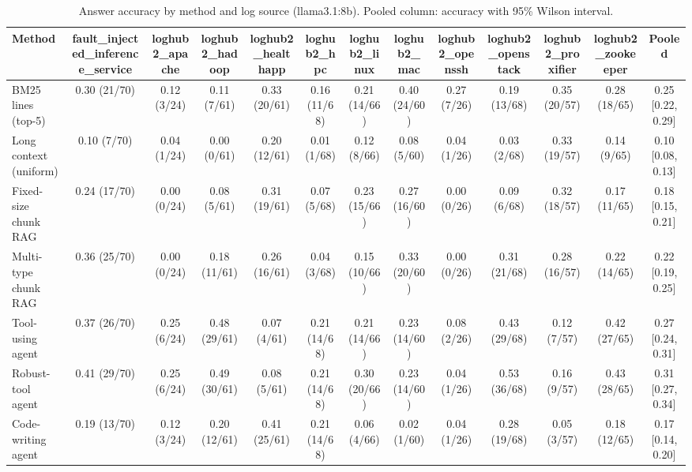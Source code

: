 \begin{table}[t]
\centering
\caption{Answer accuracy by method and log source (llama3.1:8b). Pooled column: accuracy with 95\% Wilson interval.}
\label{tab:main_comparison__llama3_1_8b}
\begin{tabular}{@{}lcccccccccccc@{}}
\toprule
Method & fault\_injected\_inference\_service & loghub2\_apache & loghub2\_hadoop & loghub2\_healthapp & loghub2\_hpc & loghub2\_linux & loghub2\_mac & loghub2\_openssh & loghub2\_openstack & loghub2\_proxifier & loghub2\_zookeeper & Pooled \\
\midrule
BM25 lines (top-5) & 0.30 (21/70) & 0.12 (3/24) & 0.11 (7/61) & 0.33 (20/61) & 0.16 (11/68) & 0.21 (14/66) & 0.40 (24/60) & 0.27 (7/26) & 0.19 (13/68) & 0.35 (20/57) & 0.28 (18/65) & 0.25 [0.22, 0.29] \\
Long context (uniform) & 0.10 (7/70) & 0.04 (1/24) & 0.00 (0/61) & 0.20 (12/61) & 0.01 (1/68) & 0.12 (8/66) & 0.08 (5/60) & 0.04 (1/26) & 0.03 (2/68) & 0.33 (19/57) & 0.14 (9/65) & 0.10 [0.08, 0.13] \\
Fixed-size chunk RAG & 0.24 (17/70) & 0.00 (0/24) & 0.08 (5/61) & 0.31 (19/61) & 0.07 (5/68) & 0.23 (15/66) & 0.27 (16/60) & 0.00 (0/26) & 0.09 (6/68) & 0.32 (18/57) & 0.17 (11/65) & 0.18 [0.15, 0.21] \\
Multi-type chunk RAG & 0.36 (25/70) & 0.00 (0/24) & 0.18 (11/61) & 0.26 (16/61) & 0.04 (3/68) & 0.15 (10/66) & 0.33 (20/60) & 0.00 (0/26) & 0.31 (21/68) & 0.28 (16/57) & 0.22 (14/65) & 0.22 [0.19, 0.25] \\
Tool-using agent & 0.37 (26/70) & 0.25 (6/24) & 0.48 (29/61) & 0.07 (4/61) & 0.21 (14/68) & 0.21 (14/66) & 0.23 (14/60) & 0.08 (2/26) & 0.43 (29/68) & 0.12 (7/57) & 0.42 (27/65) & 0.27 [0.24, 0.31] \\
Robust-tool agent & 0.41 (29/70) & 0.25 (6/24) & 0.49 (30/61) & 0.08 (5/61) & 0.21 (14/68) & 0.30 (20/66) & 0.23 (14/60) & 0.04 (1/26) & 0.53 (36/68) & 0.16 (9/57) & 0.43 (28/65) & 0.31 [0.27, 0.34] \\
Code-writing agent & 0.19 (13/70) & 0.12 (3/24) & 0.20 (12/61) & 0.41 (25/61) & 0.21 (14/68) & 0.06 (4/66) & 0.02 (1/60) & 0.04 (1/26) & 0.28 (19/68) & 0.05 (3/57) & 0.18 (12/65) & 0.17 [0.14, 0.20] \\
\bottomrule
\end{tabular}
\end{table}

